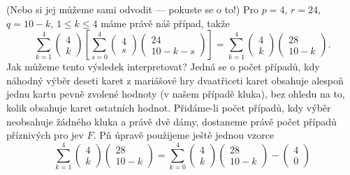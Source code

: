 \begin{example}
\begin{equation}
    \end{equation}
    (Nebo si jej můžeme sami odvodit — pokuste se o to!) Pro \(p = 4\), \(r = 24\), \(q = 10 - k\), 
    \(1 \leq k \leq 4\) máme právě náš případ, takže
    \begin{equation*}
      \sum^{4}_{k=1}\begin{pmatrix} 4  \\ k \end{pmatrix}
        \left[\sum^{4}_{s=0}\begin{pmatrix}  4 \\ s \end{pmatrix}
              \begin{pmatrix} 24 \\ 10 - k - s \end{pmatrix}
        \right] = 
        \sum^{4}_{k=1}\begin{pmatrix}  4 \\ k \end{pmatrix}
                      \begin{pmatrix} 28 \\ 10 - k \end{pmatrix}.
    \end{equation*}
    Jak můžeme tento výsledek interpretovat? Jedná se o počet případů, kdy náhodný výběr deseti 
    karet z mariášové hry dvaatřiceti karet obsahuje alespoň jednu kartu pevně zvolené hodnoty (v 
    našem případě kluka), bez ohledu na to, kolik obsahuje karet ostatních hodnot. Přidáme-li počet 
    případů, kdy výběr neobsahuje žádného kluka a právě dvě dámy, dostaneme právě počet případů 
    příznivých pro jev \(F\). Pň úpravě použijeme ještě jednou vzorce
    \begin{equation*}
      \sum^{4}_{k=1}\begin{pmatrix} 4 \\ k \end{pmatrix}\begin{pmatrix} 28 \\ 10 - k\end{pmatrix}
        = \sum^{4}_{k=0}\begin{pmatrix}  4 \\ k     \end{pmatrix}
                        \begin{pmatrix} 28 \\ 10 - k\end{pmatrix} -
                        \begin{pmatrix}  4 \\ 0     \end{pmatrix}

\end{equation*}
\end{example}
